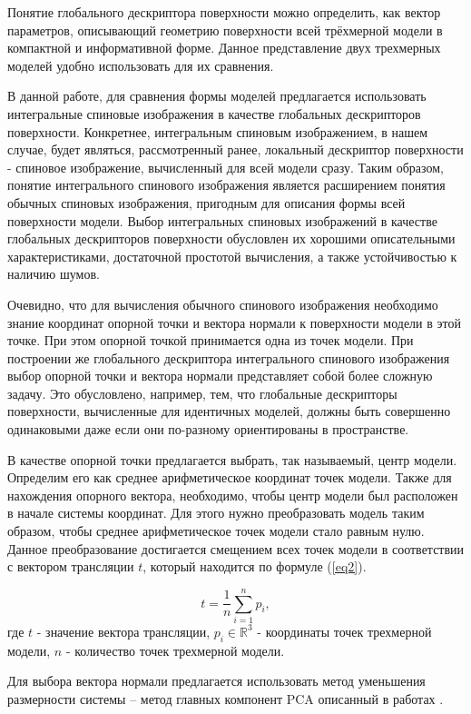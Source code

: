 \documentclass[14pt]{article}
\numberwithin{figure}{section}
\numberwithin{equation}{section}
\begin{document}
Понятие глобального дескриптора поверхности можно определить, как вектор параметров, описывающий геометрию поверхности всей трёхмерной модели в компактной и информативной форме. Данное представление двух трехмерных моделей удобно использовать для их сравнения.

В данной работе, для сравнения формы моделей предлагается использовать интегральные спиновые изображения в качестве глобальных дескрипторов поверхности. Конкретнее, интегральным спиновым изображением, в нашем случае, будет являться, рассмотренный ранее, локальный дескриптор поверхности - спиновое изображение, вычисленный для всей модели сразу. Таким образом, понятие интегрального спинового изображения является расширением понятия обычных спиновых изображения, пригодным для описания формы всей поверхности модели.
Выбор интегральных спиновых изображений в качестве глобальных дескрипторов поверхности обусловлен их хорошими описательными характеристиками, достаточной простотой вычисления, а также устойчивостью к наличию шумов.

Очевидно, что для вычисления обычного спинового изображения необходимо знание координат опорной точки и вектора нормали к поверхности модели в этой точке. При этом опорной точкой принимается одна из точек модели. При построении же глобального дескриптора интегрального спинового изображения выбор опорной точки и вектора нормали представляет собой более сложную задачу. Это обусловлено, например, тем, что глобальные дескрипторы поверхности, вычисленные для идентичных моделей, должны быть совершенно одинаковыми даже если они по-разному ориентированы в пространстве.

В качестве опорной точки предлагается выбрать, так называемый, центр модели. Определим его как среднее арифметическое координат точек модели. Также для нахождения опорного вектора, необходимо, чтобы центр модели был расположен в начале системы координат. Для этого нужно преобразовать модель таким образом, чтобы среднее арифметическое точек модели стало равным нулю. Данное преобразование достигается смещением всех точек модели в соответствии с вектором трансляции $t$, который находится по формуле (\ref{eq2}).

\begin{equation}\label{eq2}
	t = \frac{1}{n}\sum\limits^{n}_{i = 1} p_i,
\end{equation}
где $t$ - значение вектора трансляции, $p_i \in \mathbb{R}^3$ - координаты точек трехмерной модели, $n$ - количество точек трехмерной модели.

Для выбора вектора нормали предлагается использовать метод уменьшения размерности системы – метод главных компонент PCA описанный в работах \cite{Chernikoff, Norm}.
\end{document}
